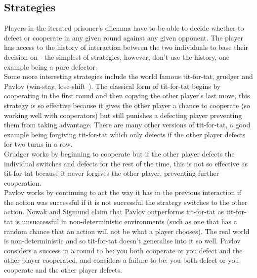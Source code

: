 \documentclass[twoside,twocolumn]{article}
\begin{document}
\subsection{Strategies}
Players in the iterated prisoner's dilemma have to be able to decide whether to defect or cooperate in any given round against any given opponent. The player has access to the history of interaction between the two individuals to base their decision on - the simplest of strategies, however, don't use the history, one example being a pure defector.\\
Some more interesting strategies include the world famous tit-for-tat, grudger and Pavlov (win-stay, lose-shift~\cite{nowak-1993a}). The classical form of tit-for-tat begins by cooperating in the first round and then copying the other player's last move, this strategy is so effective because it gives the other player a chance to cooperate (so working well with cooperators) but still punishes a defecting player preventing them from taking advantage. There are many other versions of tit-for-tat, a good example being forgiving tit-for-tat which only defects if the other player defects for two turns in a row.\\
Grudger works by beginning to cooperate but if the other player defects the individual switches and defects for the rest of the time, this is not so effective as tit-for-tat because it never forgives the other player, preventing further cooperation.\\
Pavlov works by continuing to act the way it has in the previous interaction if the action was successful if it is not successful the strategy switches to the other action. Nowak and Sigmund claim that Pavlov outperforms tit-for-tat as tit-for-tat is unsuccessful in non-deterministic environments (such as one that has a random chance that an action will not be what a player chooses). The real world is non-deterministic and so tit-for-tat doesn't generalise into it so well. Pavlov considers a success in a round to be: you both cooperate or you defect and the other player cooperated, and considers a failure to be: you both defect or you cooperate and the other player defects.
\end{document}
